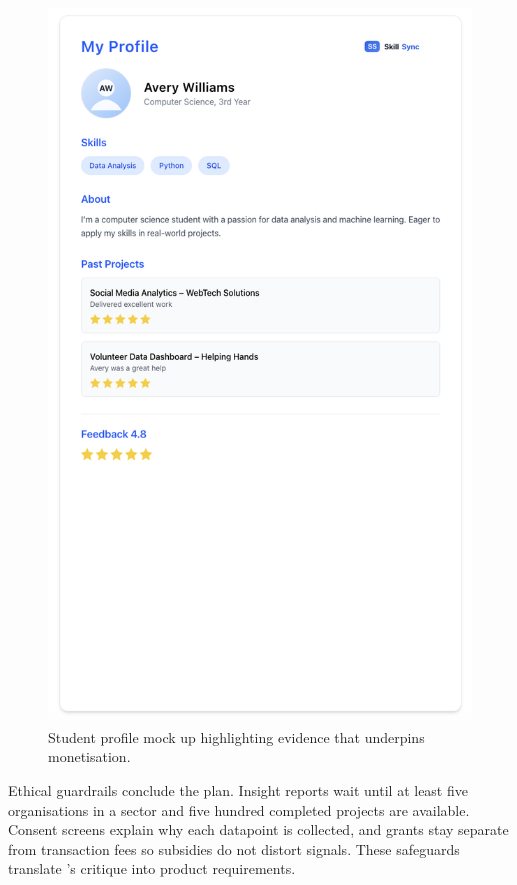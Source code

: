 \begin{figure}[H]
  \centering
  \includegraphics[width=0.8\linewidth]{figures/Student-Profile.png}
  \caption{Student profile mock up highlighting evidence that underpins monetisation.}
  \label{fig:student-profile}
\end{figure}

Ethical guardrails conclude the plan. Insight reports wait until at least five organisations in a sector and five hundred completed projects are available. Consent screens explain why each datapoint is collected, and grants stay separate from transaction fees so subsidies do not distort signals. These safeguards translate \citet{Zuboff2019}'s critique into product requirements.
